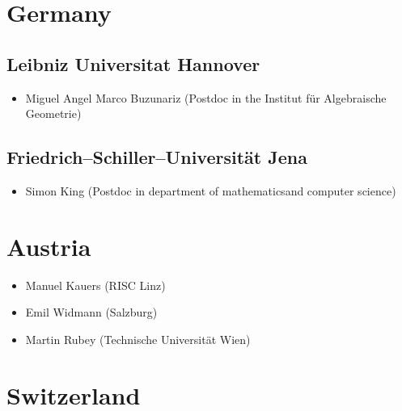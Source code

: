\newcommand{\CS}{computer science}
\newcommand{\MATH}{mathematics}

\section*{Germany}

\subsection*{Leibniz Universitat Hannover}
\begin{itemize}
\item Miguel Angel Marco Buzunariz (Postdoc in the Institut für Algebraische Geometrie)
\end{itemize}

\subsection{Friedrich--Schiller--Universität Jena}
\begin{itemize}
\item Simon King (Postdoc in department of \MATH and \CS)
\end{itemize}

\section*{Austria}

\begin{itemize}
\item Manuel Kauers (RISC Linz)
\item Emil Widmann (Salzburg)
\item Martin Rubey (Technische Universität Wien)
\end{itemize}

\section*{Switzerland}
